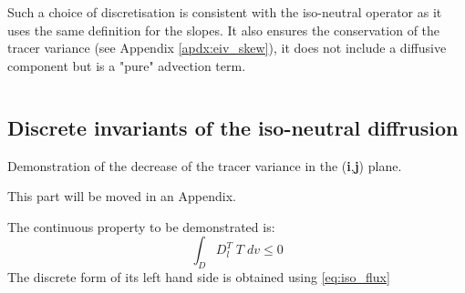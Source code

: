 \documentclass[../main/NEMO_manual]{subfiles}
\begin{document}
Such a choice of discretisation is consistent with the iso-neutral operator as
it uses the same definition for the slopes.
It also ensures the conservation of the tracer variance (see Appendix \autoref{apdx:eiv_skew}),
\ie it does not include a diffusive component but is a "pure" advection term.

$\ $\newpage      %
\subsection{Discrete invariants of the iso-neutral diffrusion}
\label{subsec:Gf_operator}

Demonstration of the decrease of the tracer variance in the (\textbf{i},\textbf{j}) plane. 

This part will be moved in an Appendix.

The continuous property to be demonstrated is:
\[
  \int_D  D_l^T \; T \;dv   \leq 0
\]
The discrete form of its left hand side is obtained using \autoref{eq:iso_flux}
\end{document}
